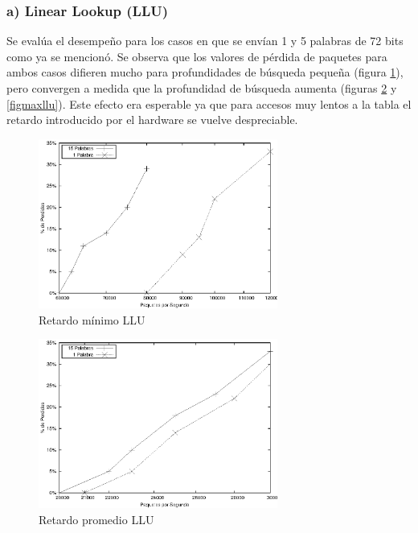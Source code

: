 \subsubsection{a) Linear Lookup (LLU)}
Se evalúa el desempeño para los casos en que se envían 1 y 5 palabras de 72 bits como ya se mencionó. Se observa que los valores de pérdida de paquetes para ambos casos difieren mucho para profundidades de búsqueda pequeña (figura \ref{figminllu}), pero convergen a medida que la profundidad de búsqueda aumenta (figuras \ref{figpromllu} y \ref{figmaxllu}). Este efecto era esperable ya que para accesos muy lentos a la tabla el retardo introducido por el hardware se vuelve despreciable.



\newpage
\begin{figure}[!h]
  \centering
	\includegraphics[width=0.7\textwidth]{5-resultados/graf/llumin.eps}
  \caption{Retardo mínimo LLU}
  \label{figminllu}
\end{figure}
\begin{figure}[!h]
  \centering
	\includegraphics[width=0.7\textwidth]{5-resultados/graf/lluprom.eps}
  \caption{Retardo promedio LLU}
  \label{figpromllu}
\newpage
\end{figure}
